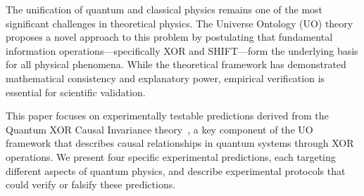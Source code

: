 The unification of quantum and classical physics remains one of the most significant challenges in theoretical physics. The Universe Ontology (UO) theory~\cite{UOTS} proposes a novel approach to this problem by postulating that fundamental information operations—specifically XOR and SHIFT—form the underlying basis for all physical phenomena. While the theoretical framework has demonstrated mathematical consistency and explanatory power, empirical verification is essential for scientific validation.

This paper focuses on experimentally testable predictions derived from the Quantum XOR Causal Invariance theory~\cite{QXCIT}, a key component of the UO framework that describes causal relationships in quantum systems through XOR operations. We present four specific experimental predictions, each targeting different aspects of quantum physics, and describe experimental protocols that could verify or falsify these predictions. 